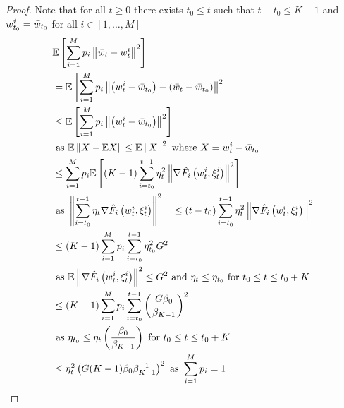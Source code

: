 \begin{proof}
    Note that for all $t \geq 0$ there exists $t_0 \leq t$ such that $t - t_0 \leq K - 1$ and $w_{t_0}^i = \Bar{w}_{t_0}$ for all $i \in \left[1, \ldots, M \right]$
    \begin{align*}
        \allowdisplaybreaks
        & \mathbb{E} \left[ \sum_{i = 1}^M p_i \norm{\Bar{w}_t - w_t^i}^2 \right] \\
        & = \mathbb{E} \left[ \sum_{i = 1}^M p_i \norm{\left( w_t^i - \Bar{w}_{t_0} \right) - \left( \Bar{w}_t - \Bar{w}_{t_0} \right)}^2 \right] \\
        & \leq \mathbb{E} \left[ \sum_{i = 1}^M p_i \norm{\left( w_t^i - \Bar{w}_{t_0} \right)}^2 \right] \\
        & \textrm{ as } \mathbb{E}\norm{X - \mathbb{E}X} \leq \mathbb{E}\norm{X}^2 \textrm{ where } X = w_t^i - \Bar{w}_{t_0} \\
        & \leq \sum_{i = 1}^M p_i \mathbb{E} \left[ (K - 1) \sum_{i = t_0}^{t - 1} \eta_t^2 \norm{\nabla \hat F_i \left( w_t^i, \xi_t^i \right)}^2 \right] \\
        & \textrm{ as } \norm{\sum_{i = t_0}^{t - 1} \eta_t \nabla \hat F_i \left( w_t^i, \xi_t^i \right)}^2 %
        \quad \leq (t - t_0) \sum_{i = t_0}^{t - 1} \eta_t^2 \norm{\nabla \hat F_i \left( w_t^i, \xi_t^i \right)}^2 \\
        & \leq (K - 1) \sum_{i = 1}^M p_i \sum_{i = t_0}^{t - 1} \eta_{t_0}^2 G^2 \\
        & \textrm{ as } \mathbb{E} \norm{\nabla \hat F_i \left( w_t^i, \xi_t^i \right)}^2 \leq G^2 %
        \textrm{ and } \eta_t \leq \eta_{t_0} \textrm{ for } t_0 \leq t \leq t_0 + K \\
        & \leq (K - 1) \sum_{i = 1}^M p_i \sum_{i = t_0}^{t - 1} \left( \dfrac{G \beta_0}{\beta_{K - 1}} \right)^2 \\
        & \textrm{ as } \eta_{t_0} \leq \eta_t \left( \dfrac{\beta_0}{\beta_{K - 1}}\right) \textrm{ for } t_0 \leq t \leq t_0 + K \\
        & \leq \eta_t^2 \left( G (K - 1) \beta_0 \beta_{K - 1}^{-1}  \right)^2 \textrm{ as } \sum_{i = 1}^M p_i = 1
    \end{align*}
\end{proof}


